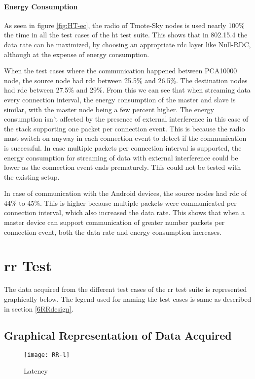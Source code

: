 \paragraph{Energy Consumption}
As seen in figure \ref{fig:HT-ec}, the radio of Tmote-Sky nodes is used nearly 100\% the time in all the test cases of the \gls{ht} test suite. This shows that in 802.15.4 the data rate can be maximized, by choosing an appropriate \gls{rdc} layer like Null-RDC, although at the expense of energy consumption. 

When the test cases where the communication happened between PCA10000 node, the source node had \gls{rdc} between 25.5\% and 26.5\%. The destination nodes had \gls{rdc} between 27.5\% and 29\%. From this we can see that when streaming data every connection interval, the energy consumption of the master and slave is similar, with the master node being a few percent higher. The energy consumption isn't affected by the presence of external interference in this case of the stack supporting one packet per connection event. This is because the radio must switch on anyway in each connection event to detect if the communication is successful. In case multiple packets per connection interval is supported, the energy consumption for streaming of data with external interference could be lower as the connection event ends prematurely. This could not be tested with the existing setup.

In case of communication with the Android devices, the source nodes had \gls{rdc} of 44\% to 45\%. This is higher because multiple packets were communicated per connection interval, which also increased the data rate. This shows that when a master device can support communication of greater number packets per connection event, both the data rate and energy consumption increases.

\section{\texorpdfstring{\acrlong{rr}}{Request-Response} Test}
The data acquired from the different test cases of the \gls{rr} test suite is represented graphically below. The legend used for naming the test cases is same as described in section \ref{6RRdesign}.
\subsection{Graphical Representation of Data Acquired}
\begin{figure}[h]
\texttt{[image: RR-l]}
\caption{Latency}
\label{fig:RR-l}
\end{figure}

